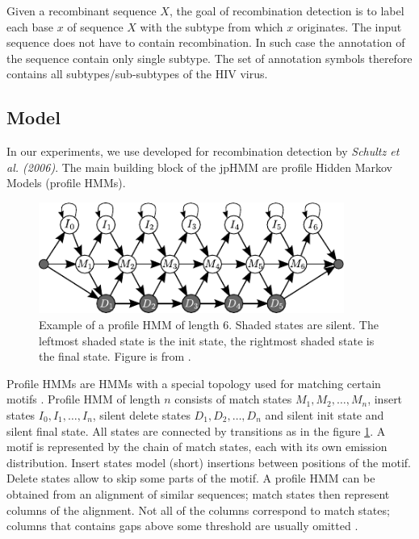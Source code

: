 Given a recombinant sequence $X$, the goal of recombination detection is to
label each base $x$ of sequence $X$ with the subtype from which $x$ originates.
The input sequence does not have to contain recombination. In such case the
annotation of the sequence contain only single subtype. The set of annotation
symbols therefore contains all subtypes/sub-subtypes of the HIV virus. 

\subsection{Model}
\label{HERD:METHODS}
In our experiments, we use   developed for
recombination detection  by {\it Schultz et al. (2006)}. The main building
block of the jpHMM are profile Hidden Markov Models (profile HMMs).

\begin{figure}
\begin{center}
\includegraphics[width=10cm]{../figures/profile_hmm}
\end{center}
\caption[Profile HMM]{Example of a profile HMM of length $6$. Shaded states are
silent. The leftmost shaded state is the init state, the rightmost
shaded state is the final state. Figure is from \cite{Nanasi2010mgr}.}\label{FIGURE:PROFILEHMM}
\end{figure}

Profile HMMs are HMMs with a special topology used for matching certain
motifs \cite{Durbin1998}. Profile HMM of length $n$ consists of match states
$M_1,M_2,\dots, M_n$, insert states $I_0, I_1, \dots, I_n$, silent delete states
$D_1, D_2,\dots, D_n$ and silent init state and silent final state. All states are
connected by transitions as in the figure \ref{FIGURE:PROFILEHMM}. A motif is
represented by the chain of match states, each with its own emission distribution.
Insert states model (short) insertions between positions of the motif. Delete states allow to
skip some parts of the motif. A profile HMM can be obtained from an alignment of
similar sequences; match states then represent columns of the alignment.
Not all of the columns correspond to match states; columns that
contains gaps above some threshold are usually omitted \cite{Durbin1998}. 

